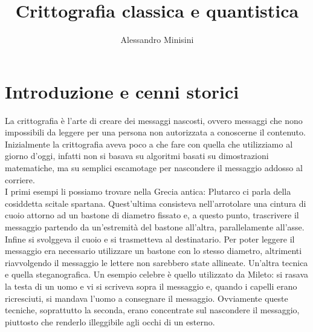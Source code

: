 \documentclass[italian,A4,12pt]{article}
\title{Crittografia classica e quantistica}
\author{Alessandro Minisini}
\affil{Liceo Scientifico Niccolò Copernico}
\date{}
\begin{document}
  \maketitle
  \tableofcontents
  \section{Introduzione e cenni storici}
    La crittografia è l'arte di creare dei messaggi nascosti, ovvero messaggi che nono impossibili da leggere per una persona non autorizzata a conoscerne il contenuto.\\
    Inizialmente la crittografia aveva poco a che fare con quella che utilizziamo al giorno d'oggi, infatti non si basava su algoritmi basati su dimostrazioni matematiche, ma su semplici escamotage per nascondere il messaggio addosso al corriere.\\
    I primi esempi li possiamo trovare nella Grecia antica: Plutarco ci parla della cosiddetta scitale spartana. Quest'ultima consisteva nell'arrotolare una cintura di cuoio attorno ad un bastone di diametro fissato e, a questo punto, trascrivere il messaggio partendo da un'estremità del bastone all'altra, parallelamente all'asse. Infine si svolggeva il cuoio e si trasmetteva al destinatario. Per poter leggere il messaggio era necessario utilizzare un bastone con lo stesso diametro, altrimenti riavvolgendo il messaggio le lettere non sarebbero state allineate. Un'altra tecnica e quella steganografica. Un esempio celebre è quello utilizzato da Mileto: si rasava la testa di un uomo e vi si scriveva sopra il messaggio e, quando i capelli erano ricresciuti, si mandava l'uomo a consegnare il messaggio.
    Ovviamente queste tecniche, soprattutto la seconda, erano concentrate sul nascondere il messaggio, piuttosto che renderlo illeggibile agli occhi di un esterno.\\
\end{document}
